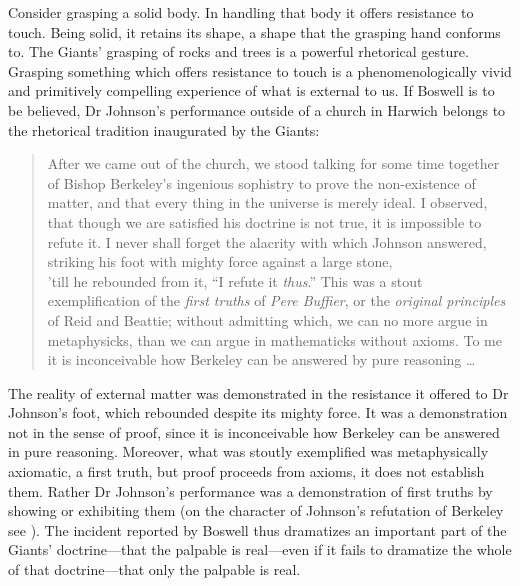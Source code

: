 Consider grasping a solid body. In handling that body it offers resistance to touch. Being solid, it retains its shape, a shape that the grasping hand conforms to. The Giants' grasping of rocks and trees is a powerful rhetorical gesture. Grasping something which offers resistance to touch is a phenomenologically vivid and primitively compelling experience of what is external to us. If Boswell is to be believed, Dr Johnson's performance outside of a church in Harwich belongs to the rhetorical tradition inaugurated by the Giants: 
\begin{quote}
	After we came out of the church, we stood talking for some time together of Bishop Berkeley's ingenious sophistry to prove the non-exist\-ence of matter, and that every thing in the universe is merely ideal. I observed, that though we are satisfied his doctrine is not true, it is impossible to refute it. I never shall forget the alacrity with which Johnson answered, striking his foot with mighty force against a large stone, \\'till he rebounded from it, ``I refute it \emph{thus}.'' This was a stout exemplification of the \emph{first truths} of \emph{Pere Buffier}, or the \emph{original principles} of Reid and Beattie; without admitting which, we can no more argue in metaphysicks, than we can argue in mathematicks without axioms. To me it is inconceivable how Berkeley can be answered by pure reasoning \ldots\ \citep[\textsc{i} 471]{Boswell:1935fk}
\end{quote}
The reality of external matter was demonstrated in the resistance it offered to Dr Johnson's foot, which rebounded despite its mighty force. It was a demonstration not in the sense of proof, since it is inconceivable how Berkeley can be answered in pure reasoning. Moreover, what was stoutly exemplified was metaphysically axiomatic, a first truth, but proof proceeds from axioms, it does not establish them. Rather Dr Johnson's performance was a demonstration of first truths by showing or exhibiting them (on the character of Johnson's refutation of Berkeley see \citealt{Patey:1986uq}). The incident reported by Boswell thus dramatizes an important part of the Giants' doctrine---that the palpable is real---even if it fails to dramatize the whole of that doctrine---that only the palpable is real.
 
